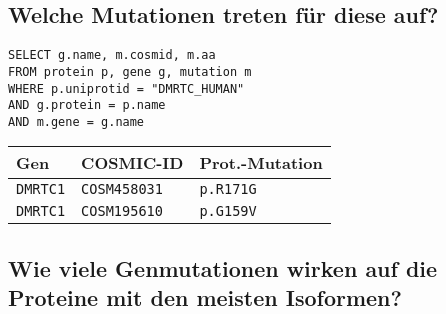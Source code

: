 \documentclass{scrartcl}
\begin{document}
\subsection{Welche Mutationen treten für diese auf?}

\noindent\begin{minipage}{.5\hsize}
\begin{verbatim}
SELECT g.name, m.cosmid, m.aa
FROM protein p, gene g, mutation m
WHERE p.uniprotid = "DMRTC_HUMAN"
AND g.protein = p.name
AND m.gene = g.name
\end{verbatim}
\end{minipage}
\begin{minipage}{.5\hsize}
\hfill\begin{tabular}{lll}
\toprule
Gen&COSMIC-ID&Prot.-Mutation\\
\midrule
\texttt{DMRTC1}&\texttt{COSM458031}&\texttt{p.R171G} \\
\texttt{DMRTC1}&\texttt{COSM195610}&\texttt{p.G159V} \\
\bottomrule
\end{tabular}
\end{minipage}

\subsection{Wie viele Genmutationen wirken auf die Proteine mit den meisten Isoformen?}
\end{document}
